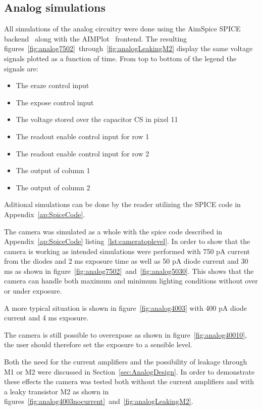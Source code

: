 \subsection{Analog simulations} \label{sec:analogSimulations}

All simulations of the analog circuitry were done using the AimSpice SPICE backend~\cite{AIMSpice} along with the AIMPlot~\cite{aimplot} frontend.
The resulting figures~\ref{fig:analog7502}~through~\ref{fig:analogLeakingM2} display the same voltage signals plotted as a function of time.
From top to bottom of the legend the signals are:
\begin{itemize}
\item The eraze control input
\item The expose control input
\item The voltage stored over the capacitor CS in pixel 11
\item The readout enable control input for row 1
\item The readout enable control input for row 2
\item The output of column 1
\item The output of column 2
\end{itemize}

Aditional simulations can be done by the reader utilizing the SPICE code in Appendix~\ref{ap:SpiceCode}.

The camera was simulated as a whole with the spice code described in Appendix~\ref{ap:SpiceCode} listing~\ref{lst:cameratoplevel}.
In order to show that the camera is working as intended simulations were performed with 750 pA current from the diodes and 2 ms exposure time as well as 50 pA diode current and 30 ms as shown in figure~\ref{fig:analog7502}~and~\ref{fig:analog5030}.
This shows that the camera can handle both maximum and minimum lighting conditions without over or under exposure.

A more typical situation is shown in figure~\ref{fig:analog4003} with 400 pA diode current and 4 ms exposure.

The camera is still possible to overexpose as shown in figure~\ref{fig:analog40010}, the user should therefore set the exposure to a sensible level.

Both the need for the current amplifiers and the possibility of leakage through M1 or M2 were discussed in Section~\ref{sec:AnalogDesign}.
In order to demonstrate these effects the camera was tested both without the current amplifiers and with a leaky transistor M2 as shown in figures~\ref{fig:analog4003nocurrent}~and~\ref{fig:analogLeakingM2}.

